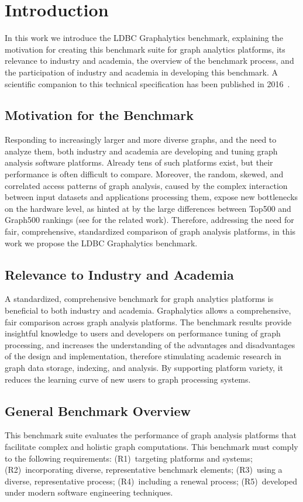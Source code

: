 \chapter{Introduction}
\label{chap:introduction}
In this work we introduce the LDBC Graphalytics benchmark, explaining the motivation for creating this benchmark suite for graph analytics platforms, its relevance to industry and academia, the overview of the benchmark process, and the participation of industry and academia in developing this benchmark. A scientific companion to this technical specification has been published in 2016~\cite{DBLP:journals/pvldb/IosupHNHPMCCSATXNB16}.

\section{Motivation for the Benchmark}
Responding to increasingly larger and more diverse graphs, and the need to analyze them, both industry and academia are developing and tuning graph analysis software platforms. Already tens of such platforms exist,	but their performance is often difficult to compare. Moreover, the random, skewed, and correlated access patterns of graph analysis, caused by the complex interaction between input datasets and applications processing them, expose new bottlenecks on the hardware level, as hinted at by the large differences between Top500 and Graph500 rankings (see  for the related work). Therefore, addressing the need for fair, comprehensive, standardized comparison of graph analysis platforms, in this work we propose the LDBC Graphalytics benchmark.

\section{Relevance to Industry and Academia}
A standardized, comprehensive benchmark for graph analytics platforms is beneficial to both industry and academia. Graphalytics allows a comprehensive, fair comparison across graph analysis platforms. The benchmark results provide insightful knowledge to users and developers on performance tuning of graph processing, and increases the understanding of the advantages and disadvantages of the design and implementation, therefore stimulating academic research in graph data storage, indexing, and analysis. By supporting platform variety, it reduces the learning curve of new users to graph processing systems.

\section{General Benchmark Overview}
This benchmark suite evaluates the performance of graph analysis platforms that facilitate complex and holistic graph computations. This benchmark must comply to the following requirements:
(R1)~targeting platforms and systems;
(R2)~incorporating diverse, representative benchmark elements;
(R3)~using a diverse, representative process;
(R4)~including a renewal process;
(R5)~developed under modern software engineering techniques.

